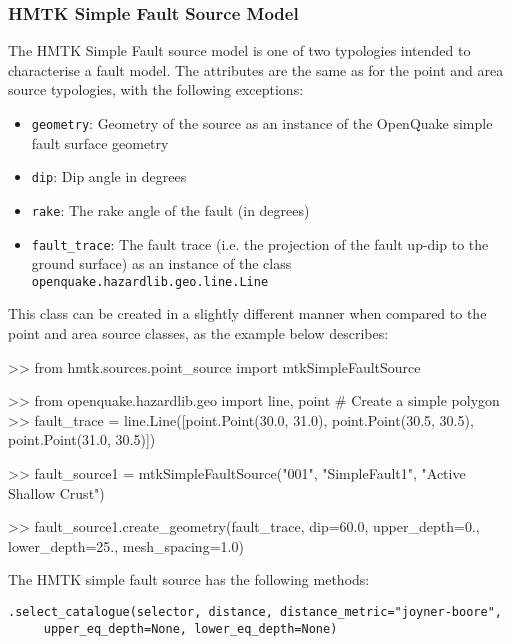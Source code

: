 \subsubsection{HMTK Simple Fault Source Model}

The HMTK Simple Fault source model is one of two typologies intended to characterise a fault model. The attributes are the same as for the point and area source typologies, with the following exceptions:


\begin{itemize}
\item \verb=geometry=: Geometry of the source as an instance of the OpenQuake simple fault surface geometry
\item \verb=dip=: Dip angle in degrees
\item \verb=rake=: The rake angle of the fault (in degrees)
\item \verb=fault_trace=: The fault trace (i.e. the projection of the fault up-dip to the ground surface) as an instance of the class \verb=openquake.hazardlib.geo.line.Line=
\end{itemize}

This class can be created in a slightly different manner when compared to the point and area source classes, as the example below describes:

\begin{python}[frame=single]
>> from hmtk.sources.point_source import mtkSimpleFaultSource

>> from openquake.hazardlib.geo import line, point
# Create a simple polygon
>> fault_trace = line.Line([point.Point(30.0, 31.0),
                            point.Point(30.5, 30.5),
                            point.Point(31.0, 30.5)]) 

>> fault_source1 = mtkSimpleFaultSource("001",
                                        "SimpleFault1",
                                        "Active Shallow Crust")

>> fault_source1.create_geometry(fault_trace, 
                                 dip=60.0,
                                 upper_depth=0.,
                                 lower_depth=25.,
                                 mesh_spacing=1.0)
\end{python}

The HMTK simple fault source has the following methods:

\verb;.select_catalogue(selector, distance, distance_metric="joyner-boore",;\\
\verb;     upper_eq_depth=None, lower_eq_depth=None);

